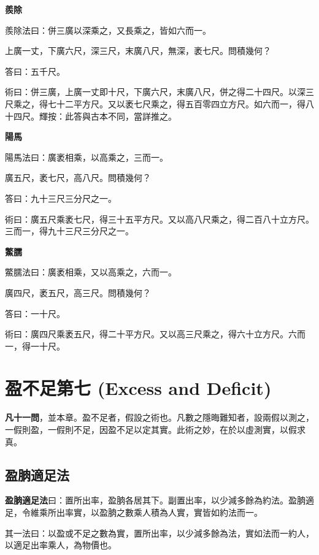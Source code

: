 \documentclass[11pt,a4paper]{article}
\newenvironment{problemenv}[1]{%
  \medskip\noindent\textbf{#1}\par\nopagebreak\smallskip
}{\medskip}
\begin{document}
\begin{problemenv}{羨除}
羨除法曰：併三廣以深乘之，又長乘之，皆如六而一。

上廣一丈，下廣六尺，深三尺，末廣八尺，無深，袤七尺。問積幾何？

\textsf{答曰：}五千尺。

\textsf{術曰：}併三廣，上廣一丈即十尺，下廣六尺，末廣八尺，併之得二十四尺。以深三尺乘之，得七十二平方尺。又以袤七尺乘之，得五百零四立方尺。如六而一，得八十四尺。輝按：此答與古本不同，當詳推之。
\end{problemenv}

\begin{problemenv}{陽馬}
陽馬法曰：廣袤相乘，以高乘之，三而一。

廣五尺，袤七尺，高八尺。問積幾何？

\textsf{答曰：}九十三尺三分尺之一。

\textsf{術曰：}廣五尺乘袤七尺，得三十五平方尺。又以高八尺乘之，得二百八十立方尺。三而一，得九十三尺三分尺之一。
\end{problemenv}

\begin{problemenv}{鱉臑}
鱉臑法曰：廣袤相乘，又以高乘之，六而一。

廣四尺，袤五尺，高三尺。問積幾何？

\textsf{答曰：}一十尺。

\textsf{術曰：}廣四尺乘袤五尺，得二十平方尺。又以高三尺乘之，得六十立方尺。六而一，得一十尺。
\end{problemenv}

\newpage
\section{盈不足第七 (Excess and Deficit)}

\textbf{凡十一問}，並本章。盈不足者，假設之術也。凡數之隱晦難知者，設兩假以測之，一假則盈，一假則不足，因盈不足以定其實。此術之妙，在於以虛測實，以假求真。

\subsection{盈朒適足法}

\textbf{盈朒適足法}曰：置所出率，盈朒各居其下。副置出率，以少減多餘為約法。盈朒適足，令維乘所出率實，以盈朒之數乘人積為人實，實皆如約法而一。

其一法曰：以盈或不足之數為實，置所出率，以少減多餘為法，實如法而一約人，以適足出率乘人，為物價也。
\end{document}
